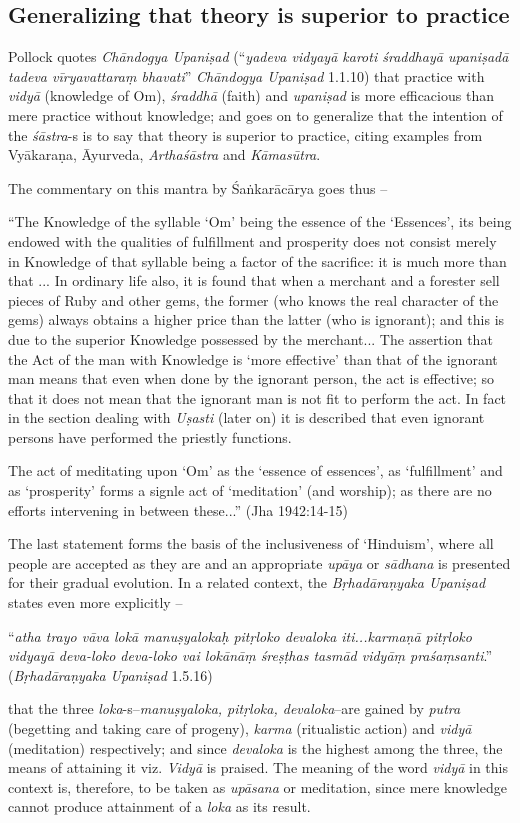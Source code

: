 \subsection{Generalizing that theory is superior to practice}\label{art12-sec3.5}

Pollock quotes {\sl Chāndogya Upaniṣad} (``{\sl yadeva vidyayā karoti śraddhayā upaniṣadā tadeva vīryavattaraṃ bhavati}'' {\sl Chāndogya Upaniṣad} 1.1.10) that practice with {\sl vidyā} (knowledge of Om), {\sl śraddhā} (faith) and {\sl upaniṣad} is more eﬃcacious than mere practice without knowledge; and goes on to generalize that the intention of the {\sl śāstra}-s is to say that theory is superior to practice, citing examples from Vyākaraṇa, Āyurveda, {\sl Arthaśāstra} and {\sl Kāmasūtra}.
\begin{myquote}
The commentary on this mantra by Śaṅkarācārya goes thus --

``The Knowledge of the syllable `Om' being the essence of the `Essences', its being endowed with the qualities of fulﬁllment and prosperity does not consist merely in Knowledge of that syllable being a factor of the sacriﬁce: it is much more than that ... In ordinary life also, it is found that when a merchant and a forester sell pieces of Ruby and other gems, the former (who knows the real character of the gems) always obtains a higher price than the	latter (who is ignorant); and this is due to the superior Knowledge possessed by the merchant... The assertion that the Act of the man with Knowledge is `more eﬀective' than that of the ignorant man means that even when done by the ignorant person, the act is eﬀective; so that it does not mean that the ignorant man is not ﬁt to perform the act. In fact in the section dealing with {\sl Uṣasti} (later on) it is described that even ignorant persons have performed the priestly functions.

The act of meditating upon `Om' as the `essence of essences', as `fulfillment' and as `prosperity' forms a signle act of `meditation' (and worship); as there are no efforts intervening in between these...'' (Jha 1942:14-15)
\end{myquote}

The last statement forms the basis of the inclusiveness of `Hinduism', where all people are accepted as they are and an appropriate {\sl upāya} or {\sl sādhana} is presented for their gradual evolution. In a related context, the {\sl Bṛhadāraṇyaka Upaniṣad} states even more explicitly --
\begin{myquote}
``{\sl atha trayo vāva lokā manuṣyalokaḥ pitṛloko devaloka iti...karmaṇā pitṛloko vidyayā deva-loko deva-loko vai lokānāṃ śreṣṭhas tasmād vidyāṃ praśaṃsanti}.'' ({\sl Bṛhadāraṇyaka Upaniṣad} 1.5.16)
\end{myquote}
that the three {\sl loka}-s--{\sl manuṣyaloka, pitṛloka, devaloka}--are gained by {\sl putra} (begetting and taking care of progeny), {\sl karma} (ritualistic action) and {\sl vidyā} (meditation) respectively; and since {\sl devaloka } is the highest among the three, the means of attaining it viz. {\sl Vidyā} is praised. The meaning of the word {\sl vidyā} in this context is, therefore, to be taken as {\sl upāsana} or meditation, since mere knowledge cannot produce attainment of a {\sl loka} as its result.

